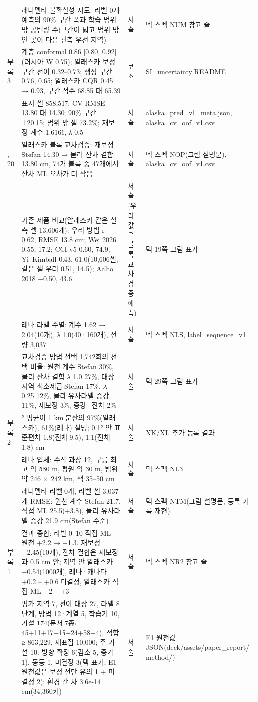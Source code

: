 {\begin{longtable}{@{}>{\raggedright\arraybackslash}p{1.2cm}>{\raggedright\arraybackslash}p{5.7cm}>{\raggedright\arraybackslash}p{2.9cm}>{\raggedright\arraybackslash}p{5.0cm}@{}}
33 & 레나델타 불확실성 지도: 라벨 0개 예측의 90\% 구간 폭과 학습 범위 밖 공변량 수(구간이 넓고 범위 밖인 곳이 다음 관측 우선 지역) & 서술 & 덱 스펙 NUM 참고 줄 \\
부록 3 & 계층 conformal 0.86 [0.80, 0.92](러시아 W 0.75); 알래스카 보정 구간 전이 0.32–0.73; 생성 구간 0.76, 0.65; 알래스카 CQR 0.45 → 0.93, 구간 점수 68.85 대 65.39 & 보조 & SI\_uncertainty README \\
20 & 표시 셀 858,517; CV RMSE 13.80 대 14.30; 90\% 구간 ±20.15; 범위 밖 셀 73.2\%; 재보정 계수 1.6166, λ 0.5 & 서술 & alaska\_pred\_v1\_meta.json, alaska\_cv\_oof\_v1.csv \\
18, 20 & 알래스카 블록 교차검증: 재보정 Stefan 14.30 → 물리 잔차 결합 13.80 cm, 74개 블록 중 47개에서 잔차 ML 오차가 더 작음 & 서술 & 덱 스펙 NOP(그림 설명문), alaska\_cv\_oof\_v1.csv \\
19 & 기존 제품 비교(알래스카 같은 실측 셀 13,606개): 우리 방법 r 0.62, RMSE 13.8 cm; Wei 2026 0.55, 17.2; CCI v5 0.60, 74.9; Yi–Kimball 0.43, 61.0(10,606셀, 같은 셀 우리 0.51, 14.5); Aalto 2018 −0.50, 43.6 & 서술(우리 값은 블록 교차검증 예측) & 덱 19쪽 그림 표기 \\
28 & 레나 라벨 수별: 계수 1.62 → 2.04(10개), λ 1.0(40·160개), 전량 3,037 & 서술 & 덱 스펙 NLS, label\_sequence\_v1 \\
29 & 교차검증 방법 선택 1,742회의 선택 비율: 원천 계수 Stefan 30\%, 물리 잔차 결합 $\lambda$ 1.0 27\%, 대상 지역 최소제곱 Stefan 17\%, $\lambda$ 0.25 12\%, 물리 유사라벨 증강 11\%, 재보정 3\%, 증강+잔차 2\% & 서술 & 덱 29쪽 그림 표기 \\
부록 2 & 0.1° 평균이 1 km 분산의 97\%(알래스카), 61\%(레나) 설명; 0.1° 안 표준편차 1.8(전체 9.5), 1.1(전체 1.8) cm & 서술 & XK/XL 추가 등록 결과 \\
35 & 레나 입체: 수직 과장 12, 구릉 최고 약 580 m, 평원 약 30 m, 범위 약 246 × 242 km, 색 35–50 cm & 서술 & 덱 스펙 NL3 \\
25 & 레나델타 라벨 0개, 라벨 셀 3,037개 RMSE: 원천 계수 Stefan 21.7, 직접 ML 25.5(+3.8), 물리 유사라벨 증강 21.9 cm(Stefan 수준) & 서술 & 덱 스펙 NTM(그림 설명문, 등록 기록 재현) \\
부록 1 & 결과 종합: 라벨 0–10 직접 ML − 원천 +2.2 → +1.3, 재보정 −2.45(10개), 잔차 결합은 재보정과 0.5 cm 안; 지역 안 알래스카 −0.54(1000개), 레나·캐나다 +0.2 – +0.6 미결정, 알래스카 직접 ML +2 – +3 & 서술 & 덱 스펙 NR2 참고 줄 \\
37 & 평가 지역 7, 전이 대상 27, 라벨 8단계, 방법 12·계열 5, 학습기 10, 가설 174(문서 7종: 45+11+17+15+24+58+4), 적합 ≥ 863,229, 재표집 10,000; 주 가설 10: 방향 확정 6(감소 5, 증가 1), 동등 1, 미결정 3(덱 표기; E1 원천값은 보정 전만 유의 1 + 미결정 2); 환경 간 차 3.6e-14 cm(34,360키) & 서술 & E1 원천값 JSON(deck/assets/paper\_report/ method/) \\

\end{longtable}}
